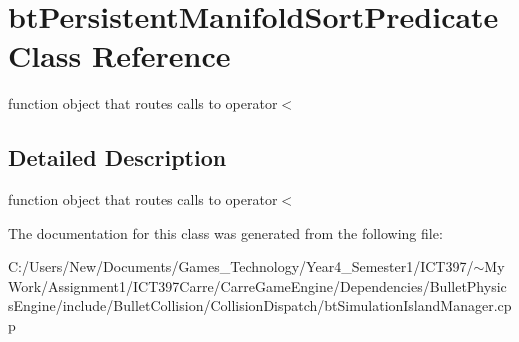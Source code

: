 \hypertarget{classbt_persistent_manifold_sort_predicate}{
\section{btPersistentManifoldSortPredicate Class Reference}
\label{classbt_persistent_manifold_sort_predicate}
}
function object that routes calls to operator$<$  




\subsection{Detailed Description}
function object that routes calls to operator$<$ 

The documentation for this class was generated from the following file:\begin{CompactItemize}
\item 
C:/Users/New/Documents/Games\_\-Technology/Year4\_\-Semester1/ICT397/$\sim$My Work/Assignment1/ICT397Carre/CarreGameEngine/Dependencies/BulletPhysicsEngine/include/BulletCollision/CollisionDispatch/btSimulationIslandManager.cpp\end{CompactItemize}
